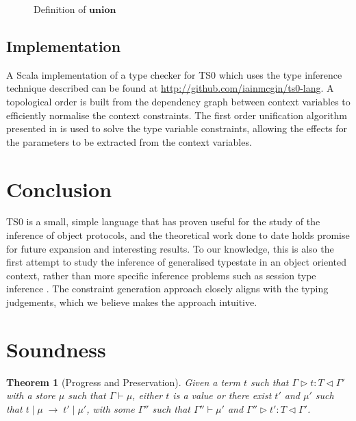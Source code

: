 \documentclass[preprint]{sigplanconf}
\newtheorem{thm}{Theorem}
\newcommand{\typerule}[4]{#1 \triangleright #2 : #3 \triangleleft #4}
\newcommand{\oprule}[4]{#1 \mid #2\;\longrightarrow\;#3 \mid #4}
\begin{document}
\begin{figure}

\caption{\label{fig:overlaydefn} Definition of $\mathbf{union}$}
\end{figure}


\subsection{Implementation}

A Scala implementation of a type checker for TS0 which uses the type inference
technique described can be found at \url{http://github.com/iainmcgin/ts0-lang}.
A topological order is built from the dependency graph between context variables
to efficiently normalise the context constraints. The first order unification 
algorithm presented in \cite{Martelli1982} is used to solve the type variable 
constraints, allowing the effects for the parameters to be extracted from
the context variables.

\section{Conclusion}

TS0 is a small, simple language that has proven useful
for the study of the inference of object protocols, and the theoretical work
done to date holds promise for future expansion and interesting results. 
To our knowledge, this is also the first attempt to study the inference
of generalised typestate in an object oriented context, rather than
more specific inference problems such as session type inference
\cite{Collingbourne2010}. The
constraint generation approach closely aligns with the typing judgements,
which we believe makes the approach intuitive.

\appendix

\section{Soundness}
\label{app:soundness}

\begin{thm}[Progress and Preservation]
Given a term $t$ such that $\typerule{\Gamma}{t}{T}{\Gamma'}$
with a store $\mu$ such that $\Gamma \vdash \mu$, either $t$ is a value or 
there exist $t'$ and $\mu'$ such that
$\oprule{t}{\mu}{t'}{\mu'}$, with some $\Gamma''$ such that
$\Gamma'' \vdash \mu'$ and $\typerule{\Gamma''}{t'}{T}{\Gamma'}$.
\end{thm}
\end{document}
